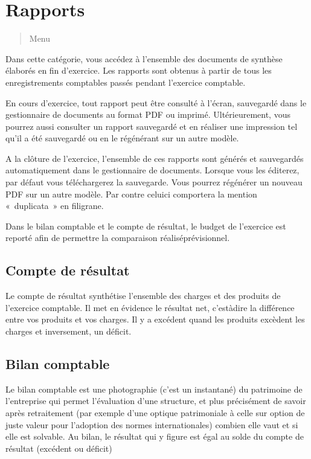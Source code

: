 \documentclass[a4paper,10pt,oneside,french]{sphinxmanual}
\begin{document}
\section{Rapports}
\label{\detokenize{accounting/reporting:rapports}}\label{\detokenize{accounting/reporting::doc}}\begin{quote}

\sphinxAtStartPar
Menu 
\end{quote}

\sphinxAtStartPar
Dans cette catégorie, vous accédez à l’ensemble des documents de synthèse élaborés en fin d’exercice. Les rapports sont obtenus à partir de tous les enregistrements comptables passés pendant l’exercice comptable.

\sphinxAtStartPar
En cours d’exercice, tout rapport peut être consulté à l’écran, sauvegardé dans le gestionnaire de documents au format PDF ou imprimé. Ultérieurement, vous pourrez aussi consulter un rapport sauvegardé et en réaliser une impression tel qu’il a été sauvegardé ou en le régénérant sur un autre modèle.

\sphinxAtStartPar
A la clôture de l’exercice, l’ensemble de ces rapports sont générés et sauvegardés automatiquement dans le gestionnaire de documents. Lorsque vous les éditerez, par défaut vous téléchargerez la sauvegarde. Vous pourrez régénérer un nouveau PDF sur un autre modèle. Par contre celui\sphinxhyphen{}ci comportera la mention « duplicata » en filigrane.

\sphinxAtStartPar
Dans le bilan comptable et le compte de résultat, le budget de l’exercice est reporté afin de permettre la comparaison réalisé\sphinxhyphen{}prévisionnel.


\subsection{Compte de résultat}
\label{\detokenize{accounting/reporting:compte-de-resultat}}
\sphinxAtStartPar
Le compte de résultat  synthétise l’ensemble des charges et des produits de l’exercice comptable.
Il met en évidence le résultat net, c’est\sphinxhyphen{}à\sphinxhyphen{}dire la différence entre vos produits et vos charges. Il y a excédent quand les produits excèdent les charges et inversement, un déficit.


\subsection{Bilan comptable}
\label{\detokenize{accounting/reporting:bilan-comptable}}
\sphinxAtStartPar
Le bilan comptable est une photographie (c’est un instantané) du patrimoine de l’entreprise qui permet l’évaluation d’une structure, et plus précisément de savoir après retraitement (par exemple d’une optique patrimoniale à celle sur option de juste valeur pour l’adoption des normes internationales) combien elle vaut et si elle est solvable.
Au bilan, le résultat qui y figure est égal au solde du compte de résultat (excédent ou déficit)
\end{document}

